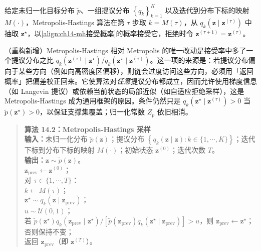 \documentclass[../../main.tex]{subfiles}
\begin{document}
\begin{definition}\label{definition:ch14-Metropolis-Hastings算法}
给定未归一化目标分布 $\widetilde{p}$、一组提议分布 $\left\{q_{k}\right\}_{k=1}^{K}$ 以及迭代到分布下标的映射 $M(\cdot)$，Metropolis-Hastings 算法在第 $\tau$ 步取 $k=M(\tau)$，从 $q_{k}\!\left(\bm{z}\mid\bm{z}^{(\tau)}\right)$ 中抽取 $\bm{z}^{\star}$，以\eqref{align:ch14-mh接受概率}的概率接受它，拒绝时令 $\bm{z}^{(\tau+1)}=\bm{z}^{(\tau)}$。
\end{definition}

\begin{remark}（重构新增）Metropolis-Hastings 相对 Metropolis 的唯一改动是接受率中多了一个提议分布之比 $q_{k}\!\left(\bm{z}^{(\tau)}\mid\bm{z}^{\star}\right)/q_{k}\!\left(\bm{z}^{\star}\mid\bm{z}^{(\tau)}\right)$。这一项的来源是：若提议分布偏向于某些方向（例如向高密度区偏移），则链会过度访问这些方向，必须用「返回概率」把偏差校正回来。它使算法对\emph{任意}提议分布都成立，因而允许使用梯度信息（如 Langevin 提议）或依赖当前状态的局部近似（如自适应拒绝采样），这是 Metropolis-Hastings 成为通用框架的原因。条件仍然只是 $q_{k}\!\left(\bm{z}^{\star}\mid\bm{z}^{(\tau)}\right)>0$ 当 $\widetilde{p}\!\left(\bm{z}^{\star}\right)>0$，以保证支撑集覆盖；归一化常数 $Z_{p}$ 依旧相消。
\end{remark}

\begin{quote}
\small
\textbf{算法 14.2：Metropolis-Hastings 采样}\\
\textbf{输入：}未归一化分布 $\widetilde{p}(\bm{z})$；提议分布 $\left\{q_{k}\!\left(\bm{z}\mid\bm{z}\right):k\in\{1,\cdots,K\}\right\}$；迭代下标到分布下标的映射 $M(\cdot)$；初始状态 $\bm{z}^{(0)}$；迭代次数 $T$。\\
\textbf{输出：}$\bm{z}\sim\widetilde{p}(\bm{z})$。\\
$\bm{z}_{\mathrm{prev}}\leftarrow\bm{z}^{(0)}$；\\
对 $\tau\in\{1,\cdots,T\}$：\\
\quad $k\leftarrow M(\tau)$；\\
\quad $\bm{z}^{\star}\sim q_{k}\!\left(\bm{z}\mid\bm{z}_{\mathrm{prev}}\right)$；\\
\quad $u\sim\mathcal{U}(0,1)$；\\
\quad 若 $\widetilde{p}\!\left(\bm{z}^{\star}\right)q_{k}\!\left(\bm{z}_{\mathrm{prev}}\mid\bm{z}^{\star}\right)/\left[\widetilde{p}\!\left(\bm{z}_{\mathrm{prev}}\right)q_{k}\!\left(\bm{z}^{\star}\mid\bm{z}_{\mathrm{prev}}\right)\right]>u$，则 $\bm{z}_{\mathrm{prev}}\leftarrow\bm{z}^{\star}$；否则保持不变；\\
返回 $\bm{z}_{\mathrm{prev}}$（即 $\bm{z}^{(T)}$）。
\end{quote}
\end{document}
